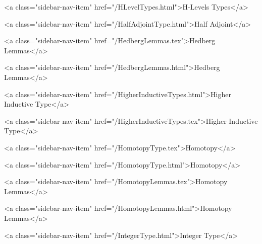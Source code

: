       
        
          <a class="sidebar-nav-item" href="/HLevelTypes.html">H-Levels Types</a>
        
      
    
      
        
          <a class="sidebar-nav-item" href="/HalfAdjointType.html">Half Adjoint</a>
        
      
    
      
        
          <a class="sidebar-nav-item" href="/HedbergLemmas.tex">Hedberg Lemmas</a>
        
      
    
      
        
          <a class="sidebar-nav-item" href="/HedbergLemmas.html">Hedberg Lemmas</a>
        
      
    
      
        
          <a class="sidebar-nav-item" href="/HigherInductiveTypes.html">Higher Inductive Type</a>
        
      
    
      
        
          <a class="sidebar-nav-item" href="/HigherInductiveTypes.tex">Higher Inductive Type</a>
        
      
    
      
        
          <a class="sidebar-nav-item" href="/HomotopyType.tex">Homotopy</a>
        
      
    
      
        
          <a class="sidebar-nav-item" href="/HomotopyType.html">Homotopy</a>
        
      
    
      
        
          <a class="sidebar-nav-item" href="/HomotopyLemmas.tex">Homotopy Lemmas</a>
        
      
    
      
        
          <a class="sidebar-nav-item" href="/HomotopyLemmas.html">Homotopy Lemmas</a>
        
      
    
      
        
          <a class="sidebar-nav-item" href="/IntegerType.html">Integer Type</a>
        

